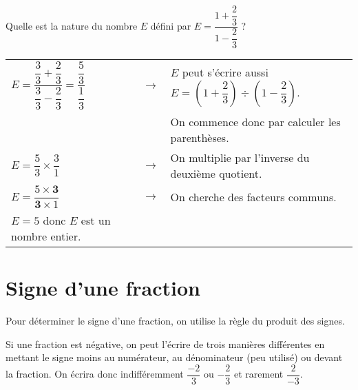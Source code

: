 \begin{exemple*1}
Quelle est la nature du nombre $E$ défini par $E=\dfrac{1+\dfrac{2}{3}}{1-\dfrac{2}{3}}$ ?
\correction
\vspace{.5em}
 
\begin{tabular}{lll}
$E=\dfrac{\dfrac{3}{3}+\dfrac{2}{3}}{\dfrac{3}{3}-\dfrac{2}{3}}=\dfrac{\dfrac{5}{3}}{\dfrac{1}{3}}$ & $\longrightarrow$ & $E$ peut s'écrire aussi $E=\left(1+\dfrac{2}{3}\right) \div \left(1-\dfrac{2}{3}\right)$. \\
 & & On commence donc par calculer les parenthèses.\\
$E=\dfrac{5}{3} \times \dfrac{3}{1}$ & $\longrightarrow$ & On multiplie par l'inverse du deuxième quotient. \\
$E=\dfrac{5\times \mathbf{3}}{\mathbf{3}\times 1}$ & $\longrightarrow$ & On cherche des facteurs communs. \\
$E=5$ donc $E$ est un nombre entier. & &  \\
\end{tabular}
\end{exemple*1}


\section{Signe d'une fraction}

\begin{propriete}
Pour déterminer le signe d'une fraction, on utilise la règle du produit des signes.
\end{propriete}

\begin{aconnaitre}
Si une fraction est négative, on peut l'écrire de trois manières différentes en mettant le signe moins au numérateur, au dénominateur (peu utilisé) ou devant la fraction.
On écrira donc indifféremment  $\dfrac{-2}{3}$ ou $-\dfrac{2}{3}$ et rarement $\dfrac{2}{-3}$.
\end{aconnaitre}

